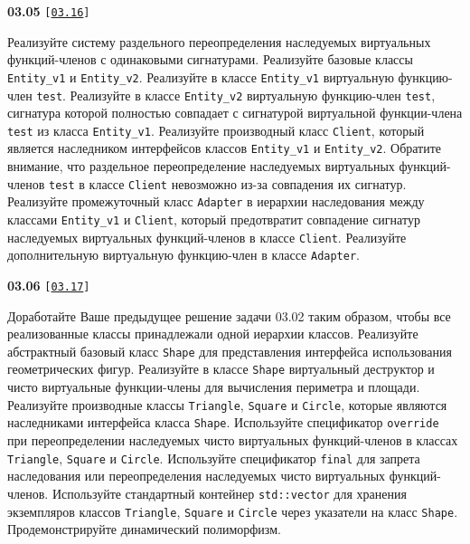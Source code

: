 \documentclass[a4paper,12pt]{article}
\begin{document}
\bigskip

{\large \textbf{03.05} \texttt{[\href{https://github.com/i-s-m-mipt/Education/blob/master/projects/examples/source/03.16.cpp}{\texttt{03.16}}]}}

\bigskip

Реализуйте систему раздельного переопределения наследуемых виртуальных функций-членов с одинаковыми сигнатурами. Реализуйте базовые классы \lstinline{Entity_v1} и \lstinline{Entity_v2}. Реализуйте в классе \lstinline{Entity_v1} виртуальную функцию-член \lstinline{test}. Реализуйте в классе \lstinline{Entity_v2} виртуальную функцию-член \lstinline{test}, сигнатура которой полностью совпадает с сигнатурой виртуальной функции-члена \lstinline{test} из класса \lstinline{Entity_v1}. Реализуйте производный класс \lstinline{Client}, который является наследником интерфейсов классов \lstinline{Entity_v1} и \lstinline{Entity_v2}. Обратите внимание, что раздельное переопределение наследуемых виртуальных функций-членов \lstinline{test} в классе \lstinline{Client} невозможно из-за совпадения их сигнатур. Реализуйте промежуточный класс \lstinline{Adapter} в иерархии наследования между классами \lstinline{Entity_v1} и \lstinline{Client}, который предотвратит совпадение сигнатур наследуемых виртуальных функций-членов в классе \lstinline{Client}. Реализуйте дополнительную виртуальную функцию-член в классе \lstinline{Adapter}.

\bigskip

{\large \textbf{03.06} \texttt{[\href{https://github.com/i-s-m-mipt/Education/blob/master/projects/examples/source/03.17.cpp}{\texttt{03.17}}]}}

\bigskip

Доработайте Ваше предыдущее решение задачи 03.02 таким образом, чтобы все реализованные классы принадлежали одной иерархии классов. Реализуйте абстрактный базовый класс \lstinline{Shape} для представления интерфейса использования геометрических фигур. Реализуйте в классе \lstinline{Shape} виртуальный деструктор и чисто виртуальные функции-члены для вычисления периметра и площади. Реализуйте производные классы \lstinline{Triangle}, \lstinline{Square} и \lstinline{Circle}, которые являются наследниками интерфейса класса \lstinline{Shape}. Используйте спецификатор \lstinline{override} при переопределении наследуемых чисто виртуальных функций-членов в классах \lstinline{Triangle}, \lstinline{Square} и \lstinline{Circle}. Используйте спецификатор \lstinline{final} для запрета наследования или переопределения наследуемых чисто виртуальных функций-членов. Используйте стандартный контейнер \lstinline{std::vector} для хранения экземпляров классов \lstinline{Triangle}, \lstinline{Square} и \lstinline{Circle} через указатели на класс \lstinline{Shape}. Продемонстрируйте динамический полиморфизм.
\end{document}
